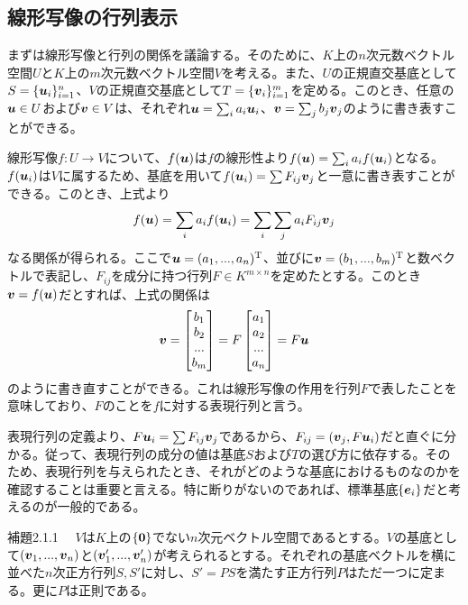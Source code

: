 \documentclass[dvipdfmx, 9pt, a4paper]{jsarticle}
\numberwithin{equation}{subsection}
\newcommand{\bm}[1]{{\mbox{\boldmath $#1$}}}
\begin{document}
\subsection{線形写像の行列表示}
まずは線形写像と行列の関係を議論する。そのために、$K$上の$n$次元数ベクトル空間$U$と$K$上の$m$次元数ベクトル空間$V$を考える。また、$U$の正規直交基底として$S=\{ \bm u_i\}_{i=1}^n$、$V$の正規直交基底として$T=\{ \bm v_i \}_{i=1}^m$を定める。このとき、任意の$\bm u \in U$および$\bm v \in V$は、それぞれ$\bm u=\sum_i a_i\bm u_i$、$\bm v=\sum_j b_j\bm v_j$のように書き表すことができる。\par
線形写像$f:U \to V$について、$f(\bm u)$は$f$の線形性より$f(\bm u)=\sum_i a_if(\bm u_i)$となる。$f(\bm u_i)$は$V$に属するため、基底を用いて$f(\bm u_i)=\sum F_{ij}\bm v_j$と一意に書き表すことができる。このとき、上式より
\begin{equation}
f(\bm u)=\sum_i a_if(\bm u_i)=\sum_i\sum_ja_iF_{ij}\bm v_j \notag
\end{equation}
なる関係が得られる。ここで$\bm u=(a_1, ..., a_n)^{\rm T}$、並びに$\bm v=(b_1, ..., b_m)^{\rm T}$と数ベクトルで表記し、$F_{ij}$を成分に持つ行列$F \in K^{m \times n}$を定めたとする。このとき$\bm v=f(\bm u)$だとすれば、上式の関係は
\begin{equation}
\bm v=
\begin{bmatrix}
b_1 \\ b_2 \\ ... \\ b_m
\end{bmatrix}
=F
\begin{bmatrix}
a_1 \\ a_2 \\ ... \\ a_n
\end{bmatrix}
=F\bm u \notag
\end{equation}
のように書き直すことができる。これは線形写像の作用を行列$F$で表したことを意味しており、$F$のことを$f$に対する表現行列と言う。\par
表現行列の定義より、$F\bm u_i=\sum F_{ij}\bm v_j$であるから、$F_{ij}=(\bm v_j, F\bm u_i)$だと直ぐに分かる。従って、表現行列の成分の値は基底$S$および$T$の選び方に依存する。そのため、表現行列を与えられたとき、それがどのような基底におけるものなのかを確認することは重要と言える。特に断りがないのであれば、標準基底$\{ \bm e_i \}$だと考えるのが一般的である。\par
\begin{itembox}[l]{補題2.1.1}
　$V$は$K$上の$\{ \bm 0\}$でない$n$次元ベクトル空間であるとする。$V$の基底として$(\bm v_1, ..., \bm v_n)$と$(\bm v'_1, ..., \bm v'_n)$が考えられるとする。それぞれの基底ベクトルを横に並べた$n$次正方行列$S, S'$に対し、$S'=PS$を満たす正方行列$P$はただ一つに定まる。更に$P$は正則である。
\end{itembox}
\end{document}

